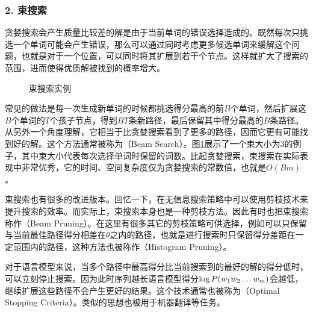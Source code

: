 
\subsubsection{2. 束搜索}

\parinterval 贪婪搜索会产生质量比较差的解是由于当前单词的错误选择造成的。既然每次只挑选一个单词可能会产生错误，那么可以通过同时考虑更多候选单词来缓解这个问题，也就是对于一个位置，可以同时将其扩展到若干个节点。这样就扩大了搜索的范围，进而使得优质解被找到的概率增大。

\begin{figure}[htp]
    \centering
 	
	\caption{束搜索实例}
    \label{fig:2-19}
\end{figure}

\parinterval 常见的做法是每一次生成新单词的时候都挑选得分最高的前$B$个单词，然后扩展这$B$个单词的$T$个孩子节点，得到$BT$条新路径，最后保留其中得分最高的$B$条路径。从另外一个角度理解，它相当于比贪婪搜索看到了更多的路径，因而它更有可能找到好的解。这个方法通常被称为{\small{}}（Beam Search）。图\ref{fig:2-19}展示了一个束大小为3的例子，其中束大小代表每次选择单词时保留的词数。比起贪婪搜索，束搜索在实际表现中非常优秀，它的时间、空间复杂度仅为贪婪搜索的常数倍，也就是$O(Bm)$。

\parinterval 束搜索也有很多的改进版本。回忆一下，在无信息搜索策略中可以使用剪枝技术来提升搜索的效率。而实际上，束搜索本身也是一种剪枝方法。因此有时也把束搜索称作{\small{}}（Beam Pruning）。在这里有很多其它的剪枝策略可供选择，例如可以只保留与当前最佳路径得分相差在$\theta$之内的路径，也就是进行搜索时只保留得分差距在一定范围内的路径，这种方法也被称作{\small{}}（Histogram Pruning）。

\parinterval 对于语言模型来说，当多个路径中最高得分比当前搜索到的最好的解的得分低时，可以立刻停止搜索。因为此时序列越长语言模型得分$\log {P}(w_1 w_2 \ldots w_m)$会越低，继续扩展这些路径不会产生更好的结果。这个技术通常也被称为{\small{}}（Optimal Stopping Criteria）。类似的思想也被用于机器翻译等任务。

